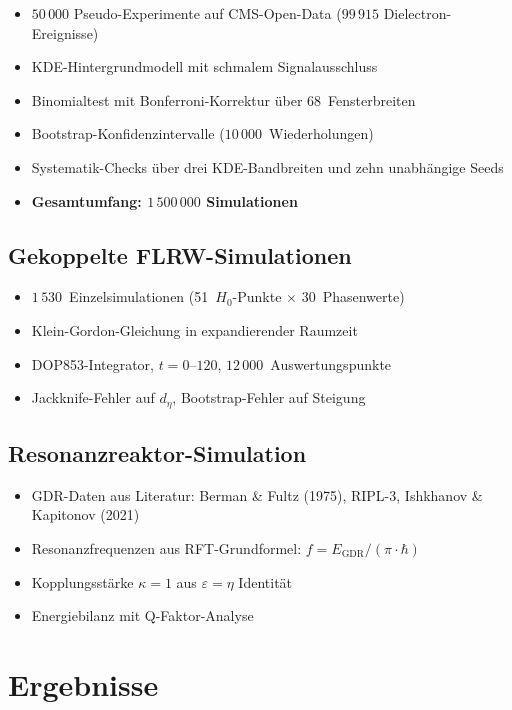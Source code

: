 \documentclass[a4paper,11pt]{article}
\begin{document}
	\begin{itemize}
		\item $50\,000$ Pseudo-Experimente auf CMS-Open-Data
		($99\,915$ Dielectron-Ereignisse)
		\item KDE-Hintergrundmodell mit schmalem Signalausschluss
		\item Binomialtest mit Bonferroni-Korrektur \"uber
		68~Fensterbreiten
		\item Bootstrap-Konfidenzintervalle
		($10\,000$~Wiederholungen)
		\item Systematik-Checks \"uber drei KDE-Bandbreiten
		und zehn unabh\"angige Seeds
		\item \textbf{Gesamtumfang: $1\,500\,000$ Simulationen}
	\end{itemize}
	
	\subsection{Gekoppelte FLRW-Simulationen}
	
	\begin{itemize}
		\item $1\,530$~Einzelsimulationen
		(51~$H_0$-Punkte $\times$ 30~Phasenwerte)
		\item Klein-Gordon-Gleichung in expandierender Raumzeit
		\item DOP853-Integrator, $t = 0$--$120$,
		$12\,000$~Auswertungspunkte
		\item Jackknife-Fehler auf $d_\eta$,
		Bootstrap-Fehler auf Steigung
	\end{itemize}
	
	\subsection{Resonanzreaktor-Simulation}
	
	\begin{itemize}
		\item GDR-Daten aus Literatur:
		Berman \& Fultz (1975), RIPL-3,
		Ishkhanov \& Kapitonov (2021)
		\item Resonanzfrequenzen aus RFT-Grundformel:
		$f = E_{\mathrm{GDR}} / (\pi \cdot \hbar)$
		\item Kopplungsst\"arke $\kappa = 1$ aus
		$\varepsilon = \eta$ Identit\"at
		\item Energiebilanz mit Q-Faktor-Analyse
	\end{itemize}
	
	\section{Ergebnisse}
	
\end{document}
